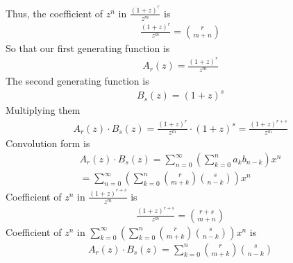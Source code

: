 Thus, the coefficient of $z^n$ in $\frac{(1+z)^{r}}{z^m}$ is
\begin{align*}
[z^n]
    \frac{(1+z)^{r}}{z^m} = \binom{r}{m+n}
\end{align*}
So that our first generating function is
\begin{align*}
    A_r(z) = \frac{(1+z)^{r}}{z^m}
\end{align*}
The second generating function is
\begin{align*}
    B_s(z) = (1+z)^{s}
\end{align*}
Multiplying them
\begin{align*}
    A_r(z) \cdot B_s(z) = \frac{(1+z)^{r}}{z^m} \cdot (1+z)^{s} = \frac{(1+z)^{r+s}}{z^m}
\end{align*}
Convolution form is
\begin{align*}
    A_r(z) \cdot B_s(z) = \sum_{n=0}^{\infty} \left( \sum_{k=0}^{n} a_k b_{n-k} \right) x^n \\
    = \sum_{n=0}^{\infty} \left( \sum_{k=0}^{n} \binom{r}{m+k} \binom{s}{n-k} \right) x^n
\end{align*}
Coefficient of $z^n$ in $\frac{(1+z)^{r+s}}{z^m}$ is
\begin{align*}
[z^n]
    \frac{(1+z)^{r+s}}{z^m} = \binom{r+s}{m+n}
\end{align*}
Coefficient of $z^n$ in $\sum_{k=0}^{\infty} \left( \sum_{k=0}^{n} \binom{r}{m+k} \binom{s}{n-k} \right) x^n$ is
\begin{align*}
[z^n]
    A_r(z) \cdot B_s(z) = \sum_{k=0}^{n} \binom{r}{m+k} \binom{s}{n-k}
\end{align*}

\clearpage
